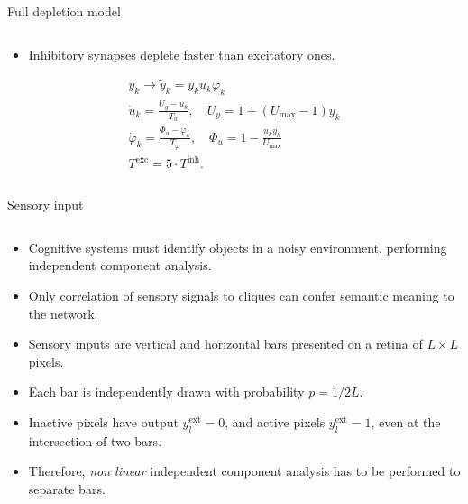 \documentclass[final,hyperref={pdfpagelabels=false}]{beamer}
\begin{document}
\begin{frame}
\begin{columns}
\begin{column}{.60\textwidth}
\begin{minipage}[T]{.95\textwidth}
{\begin{block}{Full depletion model}
\begin{columns}
\begin{column}[T]{.6\textwidth}
\begin{itemize}
						\item Inhibitory synapses deplete faster than excitatory ones.
					\end{itemize}
					\begin{gather*}
						y_k \rightarrow \tilde{y}_k = y_k u_k \varphi_k \\
						\dot{u}_k = \frac{U_y -u_k}{T_u}, \quad U_y = 1 + \left( U_\text{max} -1 \right) y_k\\ 
						\dot{\varphi}_k = \frac{\varPhi_u - \varphi_k}{T_\varphi}, \quad \varPhi_u = 1- \frac{u_k y_k}{U_\text{max}} \\
						T^{\text{exc}} = 5 \cdot T^{\text{inh}}.
					\end{gather*}
				\end{column}
			\end{columns}
		\end{block}
		\vfil
			\begin{block}{Sensory input}
				\begin{columns}
					\begin{column}[T]{.55\textwidth}		
						\begin{itemize}
							\item Cognitive systems must identify objects in a noisy environment, performing independent component analysis.
							
							\item Only correlation of sensory signals to cliques can confer semantic meaning to the network.
							
							\item Sensory inputs are vertical and horizontal bars presented on a retina of $L \times L$ pixels.
							
							\item Each bar is independently drawn with probability $p=1/2L$.
							
							\item Inactive pixels have output $y_l^{\text{ext}}=0$, and active pixels $y_l^{\text{ext}}=1$, even at the intersection of two bars.
							
							\item Therefore, \emph{non linear} independent component analysis has to be performed to separate bars.
							

\end{itemize}
\end{column}
\end{columns}
\end{block}}
\end{minipage}
\end{column}
\end{columns}
\end{frame}
\end{document}
